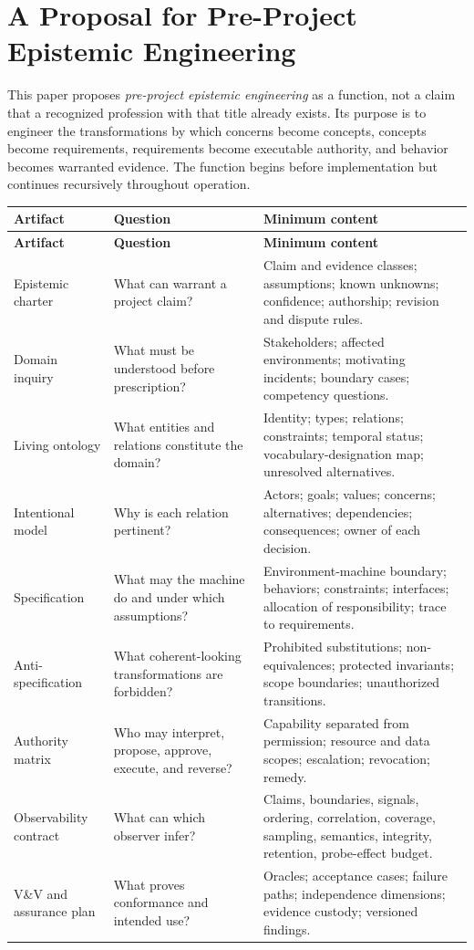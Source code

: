 \documentclass[10pt,a4paper]{article}
\begin{document}
\section{A Proposal for Pre-Project Epistemic Engineering}

This paper proposes \emph{pre-project epistemic engineering} as a function, not a claim that a recognized profession with that title already exists. Its purpose is to engineer the transformations by which concerns become concepts, concepts become requirements, requirements become executable authority, and behavior becomes warranted evidence. The function begins before implementation but continues recursively throughout operation.

\begin{longtable}{>{\raggedright\arraybackslash}p{}>{\raggedright\arraybackslash}p{}>{\raggedright\arraybackslash}p{}}
\hline
\textbf{Artifact} & \textbf{Question} & \textbf{Minimum content} \\
\hline
\endfirsthead
\hline
\textbf{Artifact} & \textbf{Question} & \textbf{Minimum content} \\
\hline
\endhead
Epistemic charter & What can warrant a project claim? & Claim and evidence classes; assumptions; known unknowns; confidence; authorship; revision and dispute rules. \\
Domain inquiry & What must be understood before prescription? & Stakeholders; affected environments; motivating incidents; boundary cases; competency questions. \\
Living ontology & What entities and relations constitute the domain? & Identity; types; relations; constraints; temporal status; vocabulary-designation map; unresolved alternatives. \\
Intentional model & Why is each relation pertinent? & Actors; goals; values; concerns; alternatives; dependencies; consequences; owner of each decision. \\
Specification & What may the machine do and under which assumptions? & Environment-machine boundary; behaviors; constraints; interfaces; allocation of responsibility; trace to requirements. \\
Anti-specification & What coherent-looking transformations are forbidden? & Prohibited substitutions; non-equivalences; protected invariants; scope boundaries; unauthorized transitions. \\
Authority matrix & Who may interpret, propose, approve, execute, and reverse? & Capability separated from permission; resource and data scopes; escalation; revocation; remedy. \\
Observability contract & What can which observer infer? & Claims, boundaries, signals, ordering, correlation, coverage, sampling, semantics, integrity, retention, probe-effect budget. \\
V\&V and assurance plan & What proves conformance and intended use? & Oracles; acceptance cases; failure paths; independence dimensions; evidence custody; versioned findings. \\
\hline
\end{longtable}
\end{document}
